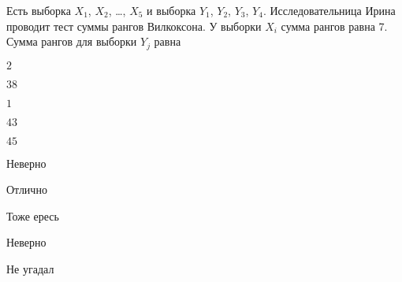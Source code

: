 
\begin{question}
Есть выборка \(X_1\), \(X_2\), \ldots, \(X_5\) и выборка \(Y_1\),
\(Y_2\), \(Y_3\), \(Y_4\). Исследовательница Ирина проводит тест суммы
рангов Вилкоксона. У выборки \(X_i\) сумма рангов равна 7. Сумма рангов
для выборки \(Y_j\) равна
\begin{answerlist}
  \item \(2\)
  \item \(38\)
  \item \(1\)
  \item \(43\)
  \item \(45\)
\end{answerlist}
\end{question}

\begin{solution}
\begin{answerlist}
  \item Неверно
  \item Отлично
  \item Тоже ересь
  \item Неверно
  \item Не угадал
\end{answerlist}
\end{solution}

